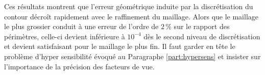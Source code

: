 Ces résultats montrent que l'erreur géométrique induite par la discrétisation du contour décroît rapidement avec le raffinement du maillage. Alors que le maillage le plus grossier conduit à une erreur de l'ordre de $2\,\%$ sur le rapport des périmètres, celle-ci devient inférieure à $10^{-4}$ dès le second niveau de discrétisation et devient satisfaisant pour le maillage le plus fin. Il faut garder en tête le problème d'hyper sensibilité évoqué au Paragraphe \ref{part:hypersens} et insister sur l'importance de la précision des facteurs de vue.


